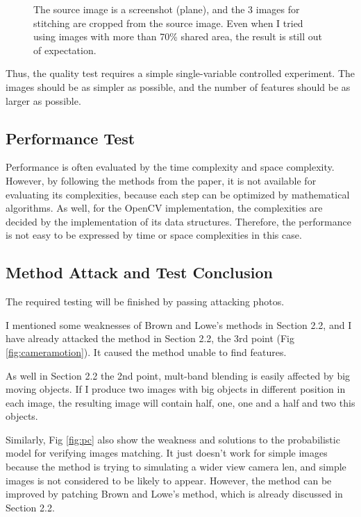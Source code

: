 \documentclass[10pt,twocolumn,letterpaper]{article}
\begin{document}
\begin{figure}[t]
\begin{center}
    \end{center}
    \caption{The source image is a screenshot (plane), and the 3 images for stitching are cropped from the source image.
    Even when I tried using images with more than 70\% shared area, the result is still out of expectation.}
    \label{fig:fail}
\end{figure}

Thus, the quality test requires a simple single-variable controlled experiment.
The images should be as simpler as possible, and the number of features should be as larger as possible.

\subsection{Performance Test}
Performance is often evaluated by the time complexity and space complexity.
However, by following the methods from the paper, it is not available for evaluating its complexities,
because each step can be optimized by mathematical algorithms. 
As well, for the OpenCV implementation, the complexities are decided by the implementation of its data structures.
Therefore, the performance is not easy to be expressed by time or space complexities in this case.

\subsection{Method Attack and Test Conclusion}
The required testing will be finished by passing attacking photos.

I mentioned some weaknesses of Brown and Lowe's methods in Section 2.2,
and I have already attacked the method in Section 2.2, the 3rd point (Fig \ref{fig:cameramotion}).
It caused the method unable to find features.

As well in Section 2.2 the 2nd point, mult-band blending is easily affected by big moving objects.
If I produce two images with big objects in different position in each image, the resulting image will contain half, one, one and a half and two this objects.

Similarly, Fig \ref{fig:pc} also show the weakness and solutions to the probabilistic model for verifying images matching.
It just doesn't work for simple images because the method is trying to simulating a wider view camera len, and simple images is not considered to be likely to appear.
However, the method can be improved by patching Brown and Lowe's method, which is already discussed in Section 2.2.
\end{document}
